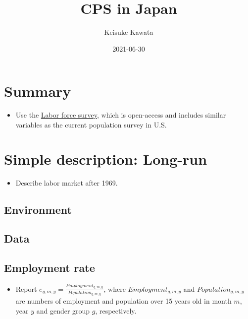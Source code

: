 \documentclass[
]{book}
\title{CPS in Japan}
\author{Keisuke Kawata}
\date{2021-06-30}
\providecommand{\tightlist}{%
  \setlength{\itemsep}{0pt}\setlength{\parskip}{0pt}}
\begin{document}
\maketitle

{
\setcounter{tocdepth}{1}
\tableofcontents
}
\hypertarget{summary}{%
\chapter{Summary}\label{summary}}

\begin{itemize}
\tightlist
\item
  Use the \href{https://www.stat.go.jp/english/data/roudou/index.html}{Labor force survey}, which is open-access and includes similar variables as the current population survey in U.S.
\end{itemize}

\hypertarget{simple-description-long-run}{%
\chapter{Simple description: Long-run}\label{simple-description-long-run}}

\begin{itemize}
\tightlist
\item
  Describe labor market after 1969.
\end{itemize}

\hypertarget{environment}{%
\section{Environment}\label{environment}}

\hypertarget{data}{%
\section{Data}\label{data}}

\hypertarget{employment-rate}{%
\section{Employment rate}\label{employment-rate}}

\begin{itemize}
\tightlist
\item
  Report \(e_{g,m,y} = \frac{Employment_{g,m,y}}{Population_{g,m,y}}\), where \(Employment_{g,m,y}\) and \(Population_{g,m,y}\) are numbers of employment and population over 15 years old in month \(m\), year \(y\) and gender group \(g\), respectively.
\end{itemize}
\end{document}
